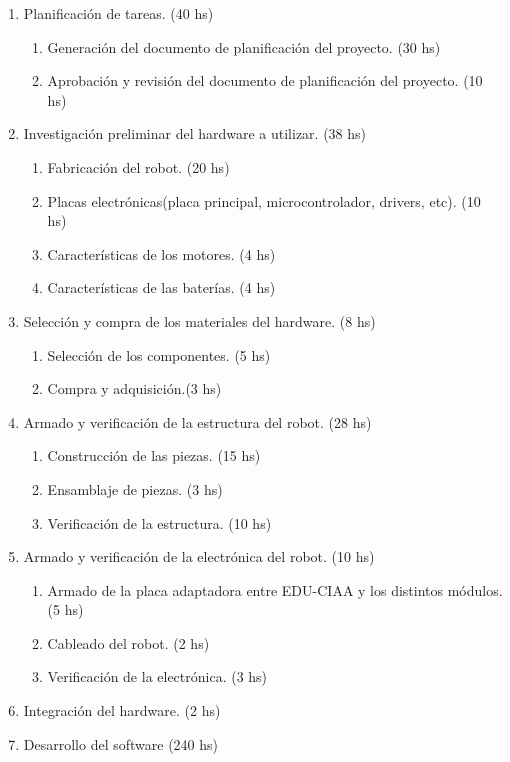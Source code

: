 \documentclass[11pt]{charter}
\begin{document}
\begin{enumerate}
\item Planificación de tareas. (40 hs)
	\begin{enumerate}
	\item Generación del documento de planificación del proyecto. (30 hs)
	\item Aprobación y revisión del documento de planificación del proyecto. (10 hs)
	\end{enumerate}
\item Investigación preliminar del hardware a utilizar. (38 hs)
	\begin{enumerate}
	\item Fabricación del robot. (20 hs)
	\item Placas electrónicas(placa principal, microcontrolador, drivers, etc). (10 hs)
	\item Características de los motores.  (4 hs)
	\item Características de las baterías. (4 hs)
	\end{enumerate}
\item Selección y compra de los materiales del hardware. (8 hs)
	\begin{enumerate}
	\item Selección de los componentes. (5 hs)
	\item Compra y adquisición.(3 hs)
	\end{enumerate}
\item Armado y verificación de la estructura del robot. (28 hs)
	\begin{enumerate}
	\item Construcción de las piezas. (15 hs)
	\item Ensamblaje de piezas. (3 hs)
	\item Verificación de la estructura. (10 hs)
	\end{enumerate}
\item Armado y verificación de la electrónica del robot. (10 hs)
	\begin{enumerate}
	\item Armado de la placa adaptadora entre EDU-CIAA y los distintos módulos. (5 hs)
	\item Cableado del robot. (2 hs)
	\item Verificación de la electrónica. (3 hs)
	\end{enumerate}	
\item Integración del hardware. (2 hs)	
\item Desarrollo del software (240 hs)
	\begin{enumerate}

\end{enumerate}
\end{enumerate}
\end{document}
